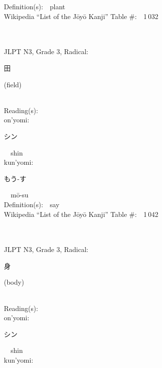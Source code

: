 \begin{multicols}{2}
Definition(s):\ \ plant \\
Wikipedia ``List of the J\=oy\=o Kanji'' Table \#:\ \ 1\,032 \\
\ \ \\
{\fontsize{34pt}{40pt}  }\ \ \\  %
{JLPT N3, Grade 3, Radical:\ \ {\begin{CJK}{UTF8}{min} 田 \end{CJK}} (field) } \\
Reading(s):\ \ \\
{\hspace*{1em}}on'yomi:\ \ \\
{\hspace*{2em}}{\begin{CJK}{UTF8}{min} シン \end{CJK}}\ \ shin\ \ \\
{\hspace*{1em}}kun'yomi:\ \ \\
{\hspace*{2em}}{\begin{CJK}{UTF8}{min} もう-す \end{CJK}}\ \ m\=o-su\ \ \\
Definition(s):\ \ say \\
Wikipedia ``List of the J\=oy\=o Kanji'' Table \#:\ \ 1\,042 \\
\ \ \\
{\fontsize{34pt}{40pt}  }\ \ \\  %
{JLPT N3, Grade 3, Radical:\ \ {\begin{CJK}{UTF8}{min} 身 \end{CJK}} (body) } \\
Reading(s):\ \ \\
{\hspace*{1em}}on'yomi:\ \ \\
{\hspace*{2em}}{\begin{CJK}{UTF8}{min} シン \end{CJK}}\ \ shin\ \ \\
{\hspace*{1em}}kun'yomi:\ \ \\

\end{multicols}
